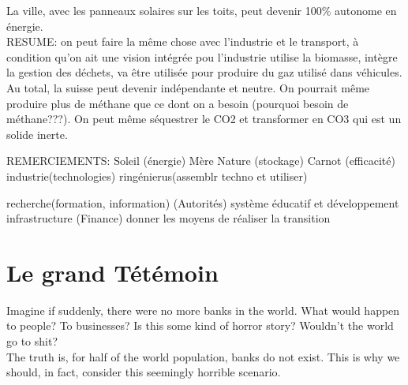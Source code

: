 \documentclass{article}
\begin{document}
 La ville, avec les panneaux solaires sur les toits, peut devenir 100\% autonome en énergie. \\

 RESUME: on peut faire la même chose avec l'industrie et le transport, à condition qu'on ait une vision intégrée pou l'industrie utilise la biomasse, intègre la gestion des déchets, va être utilisée pour produire du gaz utilisé dans véhicules. Au total, la suisse peut devenir indépendante et neutre. On pourrait même produire plus de méthane que ce dont on a besoin (pourquoi besoin de méthane???). On peut même séquestrer le CO2 et transformer en CO3 qui est un solide inerte.

REMERCIEMENTS:
Soleil (énergie)
Mère Nature (stockage)
Carnot (efficacité)
industrie(technologies)
ringénierus(assemblr techno et utiliser)

recherche(formation, information)
(Autorités) système éducatif et développement infrastructure
(Finance) donner les moyens de réaliser la transition




\section{Le grand Tétémoin}
 Imagine if suddenly, there were no more banks in the world. What would happen to people? To businesses? Is this some kind of horror story? Wouldn't the world go to shit? \\

 The truth is, for half of the world population, banks do not exist. This is why we should, in fact, consider this seemingly horrible scenario. \\
\end{document}
